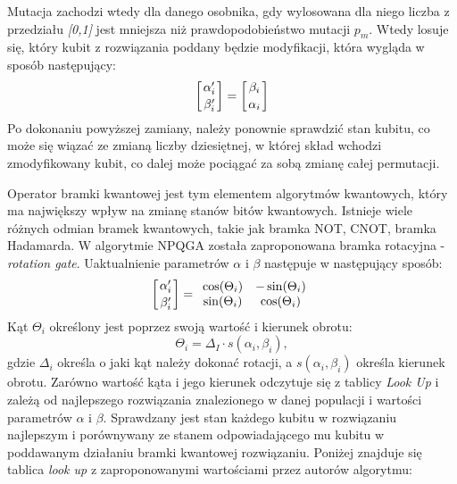 Mutacja zachodzi wtedy dla danego osobnika, gdy wylosowana dla niego liczba z przedziału \textit{[0,1]} jest mniejsza niż prawdopodobieństwo mutacji $p_m$. Wtedy losuje się, który kubit z rozwiązania poddany będzie modyfikacji, która wygląda w sposób następujący:
\newline
\begin{equation}
\left[ {\alpha_i^\prime \atop \beta_i^\prime} \right] = \left[ {\beta_i \atop \alpha_i} \right]
\end{equation}
\newline
Po dokonaniu powyższej zamiany, należy ponownie sprawdzić stan kubitu, co może się wiązać ze zmianą liczby dziesiętnej, w której skład wchodzi zmodyfikowany kubit, co dalej może pociągać za sobą zmianę całej permutacji.

Operator bramki kwantowej jest tym elementem algorytmów kwantowych, który ma największy wpływ na zmianę stanów bitów kwantowych. Istnieje wiele różnych odmian bramek kwantowych, takie jak bramka NOT, CNOT, bramka Hadamarda. W algorytmie NPQGA została zaproponowana bramka rotacyjna - \textit{rotation gate}. Uaktualnienie parametrów \textit{$\alpha$} i \textit{$\beta$} następuje w następujący sposób:
\newline
\begin{equation}
\left[ {\alpha_i^\prime \atop \beta_i^\prime} \right] = \begin{array}{ccc}
\cos(\Theta_i) & -\sin(\Theta_i) \\ \sin(\Theta_i) & \cos(\Theta_i)
\end{array}
\end{equation}
\newline
Kąt $\Theta_i$ określony jest poprzez swoją wartość i kierunek obrotu:
\newline
\begin{equation}
\Theta_i=\Delta_I \cdot s(\alpha_i, \beta_i),
\end{equation}
\newline
gdzie $\Delta_i$ określa o jaki kąt należy dokonać rotacji, a $s(\alpha_i, \beta_i)$ określa kierunek obrotu. Zarówno wartość kąta i jego kierunek  odczytuje się z tablicy \textit{Look Up} i zależą od najlepszego rozwiązania znalezionego w danej populacji i wartości parametrów $\alpha$ i $\beta$. Sprawdzany jest stan każdego kubitu w rozwiązaniu najlepszym i porównywany ze stanem odpowiadającego mu kubitu w poddawanym działaniu bramki kwantowej rozwiązaniu. Poniżej znajduje się tablica  \textit{look up} z zaproponowanymi wartościami przez autorów algorytmu:
